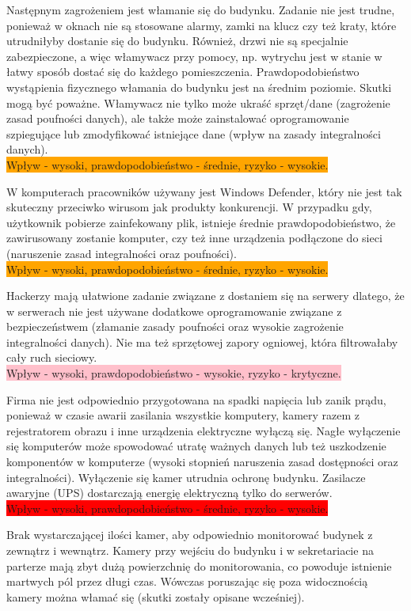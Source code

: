 Następnym zagrożeniem jest włamanie się do budynku. Zadanie nie jest trudne, ponieważ w oknach nie są stosowane alarmy, zamki na klucz czy też kraty, które utrudniłyby dostanie się do budynku. Również, drzwi nie są specjalnie zabezpieczone, a więc włamywacz przy pomocy, np. wytrychu jest w stanie w łatwy sposób dostać się do każdego pomieszczenia. Prawdopodobieństwo wystąpienia fizycznego włamania do budynku jest na średnim poziomie. Skutki mogą być poważne. Włamywacz nie tylko może ukraść sprzęt/dane (zagrożenie zasad poufności danych), ale także może zainstalować oprogramowanie szpiegujące lub zmodyfikować istniejące dane (wpływ na zasady integralności danych). \\ \colorbox{orange}{Wpływ - wysoki, prawdopodobieństwo - średnie, ryzyko - wysokie.}

W komputerach pracowników używany jest Windows Defender, który nie jest tak skuteczny przeciwko wirusom jak produkty konkurencji. W przypadku gdy, użytkownik pobierze zainfekowany plik, istnieje średnie prawdopodobieństwo, że zawirusowany zostanie komputer, czy też inne urządzenia podłączone do sieci (naruszenie zasad integralności oraz poufności). \\ \colorbox{orange}{Wpływ - wysoki, prawdopodobieństwo - średnie, ryzyko - wysokie.}

Hackerzy mają ułatwione zadanie związane z dostaniem się na serwery dlatego, że w serwerach nie jest używane dodatkowe oprogramowanie związane z bezpieczeństwem (złamanie zasady poufności oraz wysokie zagrożenie integralności danych). Nie ma też sprzętowej zapory ogniowej, która filtrowałaby cały ruch sieciowy. \\ \colorbox{pink}{Wpływ - wysoki, prawdopodobieństwo - wysokie, ryzyko - krytyczne.}

Firma nie jest odpowiednio przygotowana na spadki napięcia lub zanik prądu, ponieważ w czasie awarii zasilania wszystkie komputery, kamery \linebreak razem z rejestratorem obrazu i inne urządzenia elektryczne wyłączą się. Nagłe wyłączenie się komputerów może spowodować utratę ważnych danych lub też uszkodzenie komponentów w komputerze (wysoki stopnień naruszenia zasad dostępności oraz integralności). Wyłączenie się kamer utrudnia ochronę budynku. Zasilacze awaryjne (UPS) dostarczają energię elektryczną tylko do serwerów. \\ \colorbox{red}{Wpływ - wysoki, prawdopodobieństwo - średnie, ryzyko - wysokie.}

Brak wystarczającej ilości kamer, aby odpowiednio monitorować budynek z zewnątrz i wewnątrz. Kamery przy wejściu do budynku i w sekretariacie na parterze mają zbyt dużą powierzchnię do monitorowania, co powoduje istnienie martwych pól przez długi czas. Wówczas poruszając się poza widocznością kamery można włamać się (skutki zostały opisane wcześniej). 

